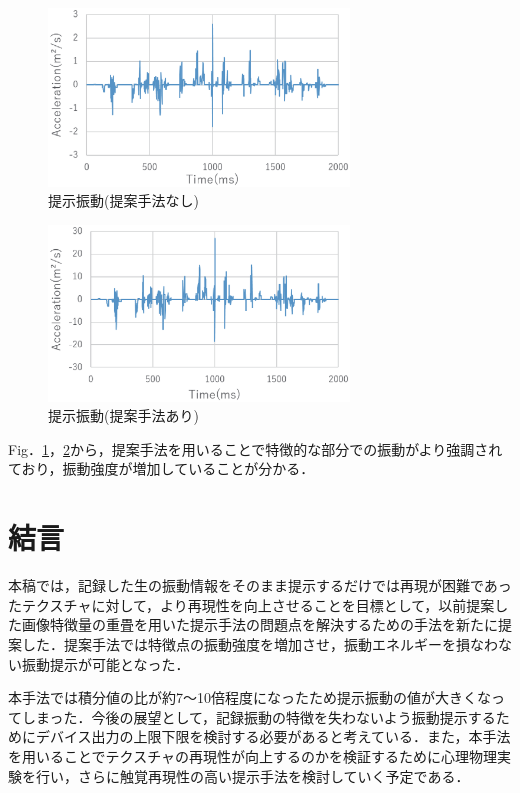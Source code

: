 \documentclass[a4paper]{jarticle}
\begin{document}
\begin{figure}[tb]
  \begin{center}
    \includegraphics*[width=80mm]{accf1.eps}
  \end{center}
  \vspace*{-6mm}
  \caption{提示振動(提案手法なし)}
  \label{fig3}
\end{figure}


\begin{figure}[tb]
  \begin{center}
    \includegraphics*[width=80mm]{accf2.eps}
  \end{center}
  \vspace*{-6mm}
  \caption{提示振動(提案手法あり)}
  \label{fig4}
\end{figure}

Fig．\ref{fig3}，\ref{fig4}から，提案手法を用いることで特徴的な部分での振動がより強調されており，振動強度が増加していることが分かる．

\section{結言}
本稿では，記録した生の振動情報をそのまま提示するだけでは再現が困難であったテクスチャに対して，より再現性を向上させることを目標として，以前提案した画像特徴量の重畳を用いた提示手法の問題点を解決するための手法を新たに提案した．提案手法では特徴点の振動強度を増加させ，振動エネルギーを損なわない振動提示が可能となった．

本手法では積分値の比が約7～10倍程度になったため提示振動の値が大きくなってしまった．今後の展望として，記録振動の特徴を失わないよう振動提示するためにデバイス出力の上限下限を検討する必要があると考えている．また，本手法を用いることでテクスチャの再現性が向上するのかを検証するために心理物理実験を行い，さらに触覚再現性の高い提示手法を検討していく予定である．



%
%
%
\end{document}
